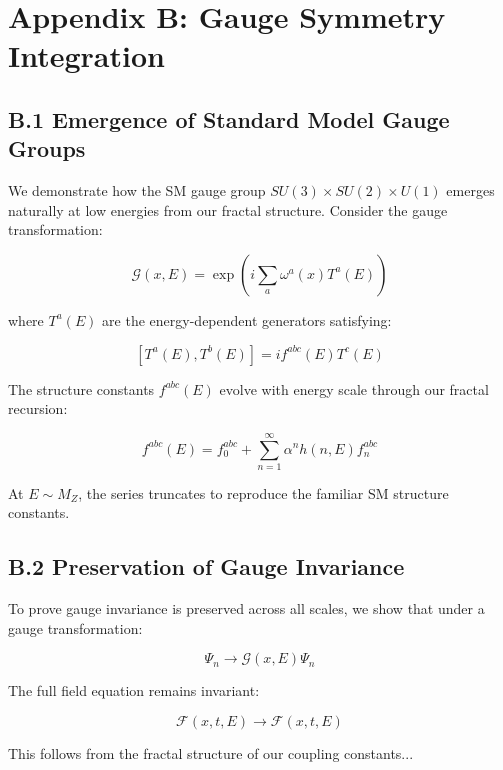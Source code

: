 \section*{Appendix B: Gauge Symmetry Integration}

\subsection*{B.1 Emergence of Standard Model Gauge Groups}

We demonstrate how the SM gauge group $SU(3)\times SU(2)\times U(1)$ emerges naturally at low energies from our fractal structure. Consider the gauge transformation:

\[
\mathcal{G}(x, E) = \exp\left(i\sum_{a} \omega^a(x) T^a(E)\right)
\]

where $T^a(E)$ are the energy-dependent generators satisfying:

\[
[T^a(E), T^b(E)] = if^{abc}(E)T^c(E)
\]

The structure constants $f^{abc}(E)$ evolve with energy scale through our fractal recursion:

\[
f^{abc}(E) = f^{abc}_0 + \sum_{n=1}^{\infty} \alpha^n h(n,E) f^{abc}_n
\]

At $E \sim M_Z$, the series truncates to reproduce the familiar SM structure constants.

\subsection*{B.2 Preservation of Gauge Invariance}

To prove gauge invariance is preserved across all scales, we show that under a gauge transformation:

\[
\Psi_n \rightarrow \mathcal{G}(x,E)\Psi_n
\]

The full field equation remains invariant:

\[
\mathcal{F}(x,t,E) \rightarrow \mathcal{F}(x,t,E)
\]

This follows from the fractal structure of our coupling constants... 